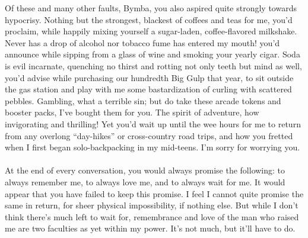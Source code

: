 \documentclass[twoside,10pt]{article}
\begin{document}
\begin{article*}
Of these and many other faults, Bymba, you also aspired quite strongly towards hypocrisy. Nothing but the strongest, blackest of coffees and teas for me, you’d proclaim, while happily mixing yourself a sugar-laden, coffee-flavored milkshake. Never has a drop of alcohol nor tobacco fume has entered my mouth! you’d announce while sipping from a glass of wine and smoking your yearly cigar. Soda is evil incarnate, quenching no thirst and rotting not only teeth but mind as well, you’d advise while purchasing our hundredth Big Gulp that year, to sit outside the gas station and play with me some bastardization of curling with scattered pebbles. Gambling, what a terrible sin; but do take these arcade tokens and booster packs, I’ve bought them for you. The spirit of adventure, how invigorating and thrilling! Yet you’d wait up until the wee hours for me to return from any overlong “day-hikes” or cross-country road trips, and how you fretted when I first began solo-backpacking in my mid-teens. I’m sorry for worrying you.
\\\\
At the end of every conversation, you would always promise the following: to always remember me, to always love me, and to always wait for me. It would appear that you have failed to keep this promise. I feel I cannot quite promise the same in return, for sheer physical impossibility, if nothing else. But while I don’t think there’s much left to wait for, remembrance and love of the man who raised me are two faculties as yet within my power. It’s not much, but it'll have to do.


\end{article*}
\end{document}
